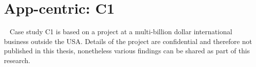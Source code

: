



\section{App-centric: C1}~\label{case-study-overview-C1}
Case study C1 is based on a project at a multi-billion dollar international business outside the USA. Details of the project are confidential and therefore not published in this thesis, nonetheless various findings can be shared as part of this research. 

